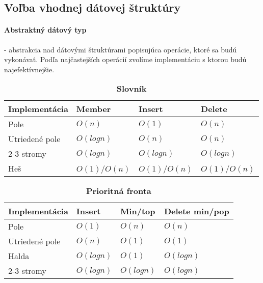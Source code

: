 	\subsection{Voľba vhodnej dátovej štruktúry}
		\paragraph{Abstraktný dátový typ} - abstrakcia nad dátovými štruktúrami popisujúca operácie, ktoré sa budú vykonávať. Podľa najčastejších operácií zvolíme implementáciu s ktorou budú najefektívnejšie.\\

		\begin{table}[h]
			\centering
			\caption{\textbf{Slovník}}
			\label{my-label}
			\begin{tabular}{|l|l|l|l|}
			\hline
			\textbf{Implementácia} & \textbf{Member} & \textbf{Insert} & \textbf{Delete}  \\ \hline
			Pole                   & $O(n)$            & $O(1)$           & $O(n)$             \\ \hline
			Utriedené pole         & $O(log n)$        & $O(n)$            & $O(n)$             \\ \hline
			2-3 stromy             & $O(log n)$        & $O(log n)$        & $O(log n)$          \\ \hline
			Heš                    & $O(1)$/$O(n)$      & $O(1)$/$O(n)$       & $O(1)$/$O(n)$        \\ \hline
			\end{tabular}
		\end{table}

		\begin{table}[h]
			\centering
			\caption{\textbf{Prioritná fronta}}
			\label{my-label}
			\begin{tabular}{|l|l|l|l|}
			\hline
			\textbf{Implementácia} & \textbf{Insert} & \textbf{Min/top} & \textbf{Delete min/pop}   \\ \hline
			Pole                   & $O(1)$            & $O(n)$             & $O(n)$                       \\ \hline
			Utriedené pole         & $O(n)$            & $O(1)$             & $O(1)$                       \\ \hline
			Halda                  & $O(log n)$        & $O(1)$             & $O(log n)$                  \\ \hline
			2-3 stromy             & $O(log n)$        & $O(log n)$         & $O(log n)$                   \\ \hline
			\end{tabular}
		\end{table}
